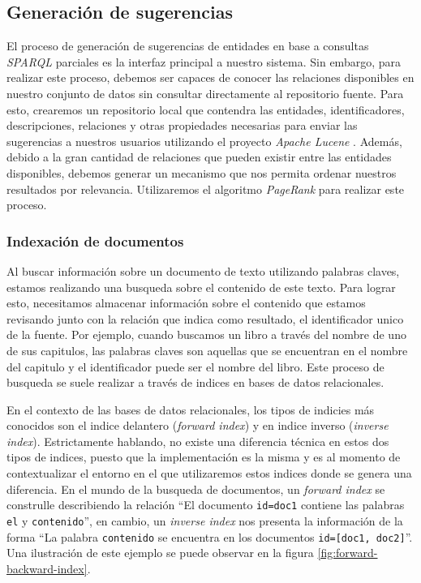 \subsection{Generación de sugerencias}

El proceso de generación de sugerencias de entidades en base a consultas
\textit{SPARQL} parciales es la interfaz principal a nuestro sistema. Sin
embargo, para realizar este proceso, debemos ser capaces de conocer las
relaciones disponibles en nuestro conjunto de datos sin consultar directamente
al repositorio fuente. Para esto, crearemos un repositorio local que contendra
las entidades, identificadores, descripciones, relaciones y otras propiedades
necesarias para enviar las sugerencias a nuestros usuarios utilizando el
proyecto \textit{Apache Lucene} \cite{apache2012welcome}. Además, debido a la
gran cantidad de relaciones que pueden existir entre las entidades disponibles,
debemos generar un mecanismo que nos permita ordenar nuestros resultados por
relevancia. Utilizaremos el algoritmo \textit{PageRank} \cite{page1999pagerank}
para realizar este proceso.

\subsubsection{Indexación de documentos}
\label{sec:index-types}

Al buscar información sobre un documento de texto utilizando palabras claves,
estamos realizando una busqueda sobre el contenido de este texto. Para lograr
esto, necesitamos almacenar información sobre el contenido que estamos revisando
junto con la relación que indica como resultado, el identificador unico de la
fuente. Por ejemplo, cuando buscamos un libro a través del nombre de uno de sus
capitulos, las palabras claves son aquellas que se encuentran en el nombre del
capitulo y el identificador puede ser el nombre del libro. Este proceso de
busqueda se suele realizar a través de indices en bases de datos relacionales.

En el contexto de las bases de datos relacionales, los tipos de indicies más
conocidos son el indice delantero (\textit{forward index}) y en indice inverso
(\textit{inverse index}). Estrictamente hablando, no existe una diferencia
técnica en estos dos tipos de indices, puesto que la implementación es la misma
y es al momento de contextualizar el entorno en el que utilizaremos estos
indices donde se genera una diferencia. En el mundo de la busqueda de
documentos, un \textit{forward index} se construlle describiendo la relación
``El documento \texttt{id=doc1} contiene las palabras \texttt{el} y
\texttt{contenido}'', en cambio, un \textit{inverse index} nos presenta la
información de la forma ``La palabra \texttt{contenido} se encuentra en los
documentos \texttt{id=[doc1, doc2]}''. Una ilustración de este ejemplo se puede
observar en la figura \ref{fig:forward-backward-index}.

